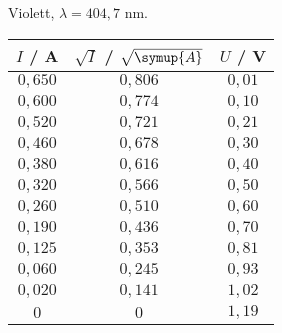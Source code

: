 \begin{subtable}{0.4\textwidth}
\centering
    \caption{Violett, $\lambda = 404,7 $ nm.} 
    
        \begin{tabular}{c c c}
        
            \toprule
            { $I$ / A} & {$\sqrt{I}$ / $\sqrt{\symup{A}}$} & {$U$ / V} \\
            \midrule
            $0,650$ & $0,806$ & $0,01$ \\
            $0,600$ & $0,774$ & $0,10$ \\
            $0,520$ & $0,721$ & $0,21$ \\
            $0,460$ & $0,678$ & $0,30$ \\
            $0,380$ & $0,616$ & $0,40$ \\
            $0,320$ & $0,566$ & $0,50$ \\
            $0,260$ & $0,510$ & $0,60$ \\
            $0,190$ & $0,436$ & $0,70$ \\
            $0,125$ & $0,353$ & $0,81$ \\
            $0,060$ & $0,245$ & $0,93$ \\
            $0,020$ & $0,141$ & $1,02$ \\
            $0    $ & $0 $    & $1,19$ \\
        \bottomrule
        \end{tabular}
        
        \end{subtable}
